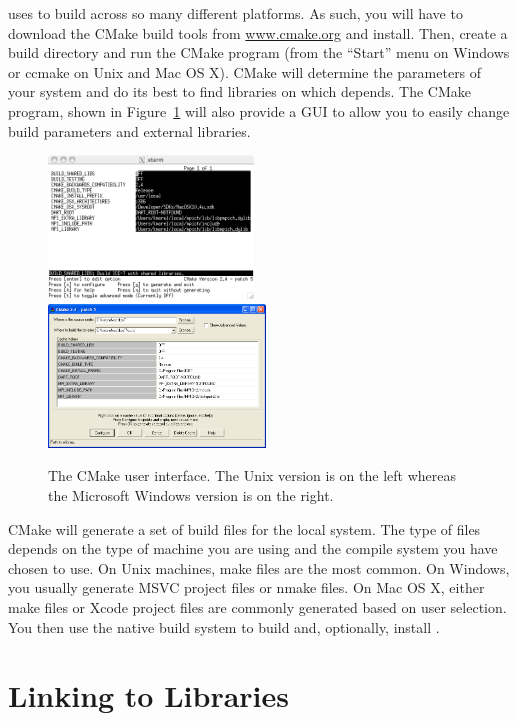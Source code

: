 \IceT uses  to build across so many different
platforms.  As such, you will have to download the CMake build tools from
\href{www.cmake.org}{www.cmake.org} and install.  Then, create a build
directory and run the CMake program (from the ``Start'' menu on Windows or
ccmake on Unix and Mac OS X).  CMake will determine the parameters of your
system and do its best to find libraries on which \IceT depends.  The CMake
program, shown in Figure~\ref{fig:Tutorial:ccmake} will also provide a GUI
to allow you to easily change build parameters and external libraries.
\begin{figure}
  \centering
  \includegraphics[height=1.5in]{images/ccmakeUnix}
  \qquad
  \includegraphics[height=1.5in]{images/ccmakeWindows}
  \caption{The CMake user interface.  The Unix version is on the left
    whereas the Microsoft Windows version is on the right.}
  \label{fig:Tutorial:ccmake}
\end{figure}

CMake will generate a set of build files for the local system.  The type of
files depends on the type of machine you are using and the compile system
you have chosen to use.  On Unix machines, make files are the most common.
On Windows, you usually generate MSVC project files or nmake files.  On Mac
OS X, either make files or Xcode project files are commonly generated based
on user selection.  You then use the native build system to build and,
optionally, install \IceT.

\section{Linking to \IceT Libraries}
\label{sec:Tutorial:Linking_to_IceT_Libraries}

